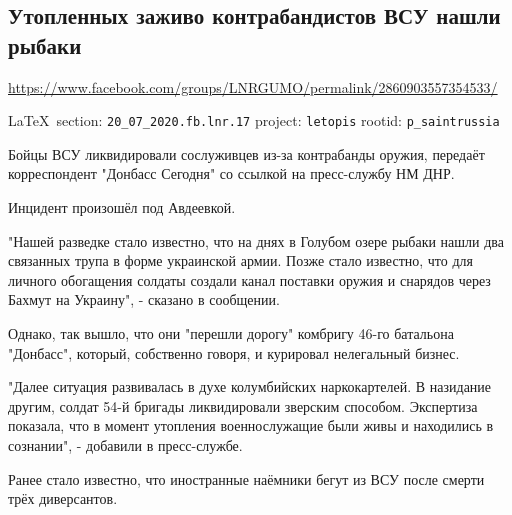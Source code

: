  
 
\subsection{Утопленных заживо контрабандистов ВСУ нашли рыбаки}
\label{sec:20_07_2020.fb.lnr.17}
\url{https://www.facebook.com/groups/LNRGUMO/permalink/2860903557354533/}
  
\vspace{0.5cm}
{\small\LaTeX~section: \verb|20_07_2020.fb.lnr.17| project: \verb|letopis| rootid: \verb|p_saintrussia|}
\vspace{0.5cm}
  

Бойцы ВСУ ликвидировали сослуживцев из-за контрабанды оружия, передаёт
корреспондент "Донбасс Сегодня" со ссылкой на пресс-службу НМ ДНР.

Инцидент произошёл под Авдеевкой.

"Нашей разведке стало известно, что на днях в Голубом озере рыбаки нашли два связанных трупа в форме украинской армии. Позже стало известно, что для личного обогащения солдаты создали канал поставки оружия и снарядов через Бахмут на Украину", - сказано в сообщении.

Однако, так вышло, что они "перешли дорогу" комбригу 46-го батальона "Донбасс", который, собственно говоря, и курировал нелегальный бизнес.

"Далее ситуация развивалась в духе колумбийских наркокартелей. В назидание другим, солдат 54-й бригады ликвидировали зверским способом. Экспертиза показала, что в момент утопления военнослужащие были живы и находились в сознании", - добавили в пресс-службе.

Ранее стало известно, что иностранные наёмники бегут из ВСУ после смерти трёх диверсантов.
